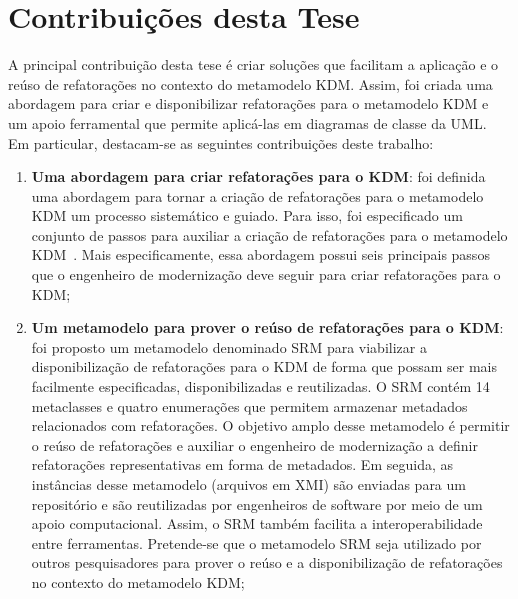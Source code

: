 \section{Contribuições desta Tese}\label{sec:contribuicoes_desta_tese}

A principal contribuição desta tese é criar soluções que facilitam a aplicação e o reúso de refatorações no contexto do metamodelo KDM. Assim, foi criada uma abordagem para criar e disponibilizar refatorações para o metamodelo KDM e um apoio ferramental que permite aplicá-las em diagramas de classe da UML. %
%
Em particular, destacam-se as seguintes contribuições deste trabalho:

\begin{enumerate}

\item \textbf{Uma abordagem para criar refatorações para o KDM}: foi definida uma abordagem para tornar a criação de refatorações para o metamodelo KDM um processo sistemático e guiado. Para isso, foi especificado um conjunto de passos para auxiliar a criação de refatorações para o metamodelo KDM~\cite{durelli_catalogo}. Mais especificamente, essa abordagem possui seis principais passos que o engenheiro de modernização deve seguir para criar refatorações para o KDM;

\item \textbf{Um metamodelo para prover o reúso de refatorações para o KDM}: foi proposto um metamodelo denominado SRM para viabilizar a disponibilização de refatorações para o KDM de forma que possam ser mais facilmente especificadas, disponibilizadas e reutilizadas. O SRM contém 14 metaclasses e quatro enumerações que permitem armazenar metadados relacionados com refatorações. O objetivo amplo desse metamodelo é permitir o reúso de refatorações e auxiliar o engenheiro de modernização a definir refatorações representativas em forma de metadados. Em seguida, as instâncias desse metamodelo (arquivos em XMI) são enviadas para um repositório e são reutilizadas por engenheiros de software por meio de um apoio computacional. Assim, o SRM também facilita a interoperabilidade entre ferramentas. Pretende-se que o metamodelo SRM seja utilizado por outros pesquisadores para prover o reúso e a disponibilização de refatorações no contexto do metamodelo KDM;



\end{enumerate}
